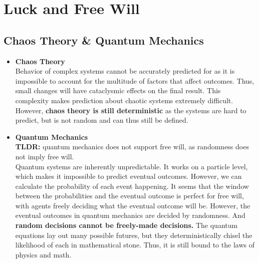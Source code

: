 \documentclass[11pt]{article}
\begin{document}
\section{Luck and Free Will}
\subsection{Chaos Theory \& Quantum Mechanics}
\begin{itemize}
 \item {
       \textbf{Chaos Theory}
       \\ Behavior of complex systems cannot be accurately predicted for as it is impossible to account for the multitude of factors that affect outcomes. Thus, small changes will have cataclysmic effects on the final result. This complexity makes prediction about chaotic systems extremely difficult. However, \textbf{chaos theory is still deterministic} as the systems are hard to predict, but is not random and can thus still be defined.
       }
 \item {
       \textbf{Quantum Mechanics}
       \\\textbf{TLDR:} quantum mechanics does not support free will, as randomness does not imply free will.
       \\ Quantum systems are inherently unpredictable. It works on a particle level, which makes it impossible to predict eventual outcomes. However, we can calculate the probability of each event happening. It seems that the window between the probabilities and the eventual outcome is perfect for free will, with agents freely deciding what the eventual outcome will be. However, the eventual outcomes in quantum mechanics are decided by randomness. And \textbf{random decisions cannot be freely-made decisions.}  The quantum equations lay out many possible futures, but they deterministically chisel the likelihood of each in mathematical stone. Thus, it is still bound to the laws of physics and math.
       
}
\end{itemize}
\end{document}
